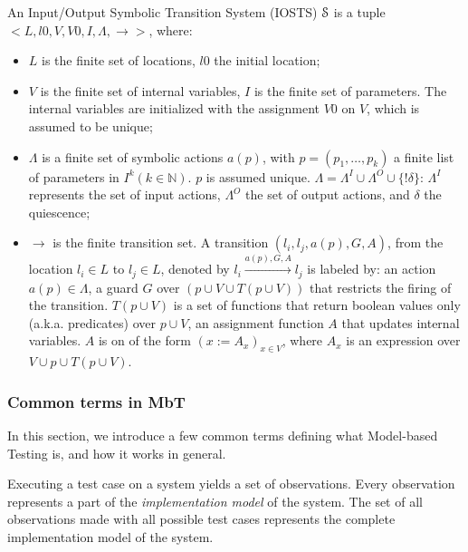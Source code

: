 \begin{definition}
An Input/Output Symbolic Transition System (IOSTS) $\EuScript{S}$
is a tuple $< L,l0,V,V0,I,\Lambda,\rightarrow>$, where:

\begin{itemize}
\item $L$ is the finite set of locations, $l0$ the initial
location;

\item $V$ is the finite set of internal variables, $I$ is the
finite set of parameters. The internal variables are initialized
with the assignment $V0$ on $V$, which is assumed to be unique;

\item $\Lambda$ is a finite set of symbolic actions $a(p)$, with
$p = (p_1,\dots,p_k)$ a finite list of parameters in $I^k(k \in
\mathbb{N})$. $p$ is assumed unique. $\Lambda= \Lambda^I  \cup
\Lambda^O \cup \{!\delta \}$: $\Lambda^I$ represents the set of
input actions, $\Lambda^O$ the set of output actions, and
$\delta$ the quiescence;

\item $\rightarrow$ is the finite transition set. A transition
$(l_i,l_j,a(p),G,A)$, from the location $l_i \in L$ to $l_j \in
L$, denoted by $l_i \xrightarrow{a(p),G,A} l_j$ is labeled by: an
action $a(p) \in \Lambda$, a guard  $G$ over $(p \cup V \cup T(p
\cup V))$ that restricts the firing of the transition. $T(p \cup
V)$ is a set of functions that return boolean values only (a.k.a.
predicates) over $p \cup V$, an assignment function $A$ that
updates internal variables. $A$ is on of the form $(x:=A_x)_{x\in
V}$, where $A_x$ is an expression over $V \cup p \cup T(p \cup
V)$.
\end{itemize}
\end{definition}

\subsubsection{Common terms in MbT}

In this section, we introduce a few common terms defining what
Model-based Testing is, and how it works in general.

Executing a test case on a system yields a set of observations.
Every observation represents a part of the \textit{implementation
model} of the system. The set of all observations made with all
possible test cases represents the complete implementation model
of the system.

